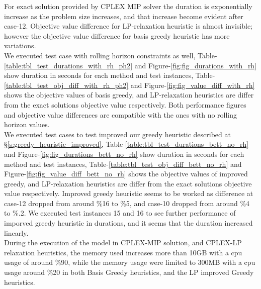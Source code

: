 \documentclass[11pt]{article}
\begin{document}
For exact solution provided by CPLEX MIP solver the duration is exponentially increase as the problem size increases, and that increase become evident after case-12. Objective value difference for LP-relaxation heuristic is almost invisible; however the objective value difference for basis greedy heuristic has more variations.\\

We executed test case with rolling horizon constraints as well, Table-\ref{table:tbl_test_durations_with_rh_ph2} and Figure-\ref{fig:fig_durations_with_rh} show duration in seconds for each method and test instances, Table-\ref{table:tbl_test_obj_diff_with_rh_ph2} and Figure-\ref{fig:fig_value_diff_with_rh} shows the objective values of basis greedy, and LP-relaxation heuristics are differ from the exact solutions objective value respectively. Both performance figures and objective value differences are compatible with the ones with no rolling horizon values.\\

We executed test cases to test improved our greedy heuristic described at \S \ref{s:greedy_heuristic_improved}, Table-\ref{table:tbl_test_durations_bett_no_rh} and Figure-\ref{fig:fig_durations_bett_no_rh} show duration in seconds for each method and test instances, Table-\ref{table:tbl_test_obj_diff_bett_no_rh} and Figure-\ref{fig:fig_value_diff_bett_no_rh} shows the objective values of improved greedy, and LP-relaxation heuristics are differ from the exact solutions objective value respectively. Improved greedy heuristic seems to be worked as difference at case-12 dropped from around \%16 to \%5, and case-10 dropped from around \%4 to \%.2. We executed test instances 15 and 16 to see further performance of imporved greedy heuristic in durations, and it seems that the duration increased linearly.\\

During the execution of the model in CPLEX-MIP solution, and CPLEX-LP relaxation heuristics, the memory used increases more than 10GB with a cpu usage of around \%90, while the memory usage were limited to 300MB with a cpu usage around \%20 in both Basis Greedy heuristics, and the LP improved Greedy heuristics.\\

\end{document}
